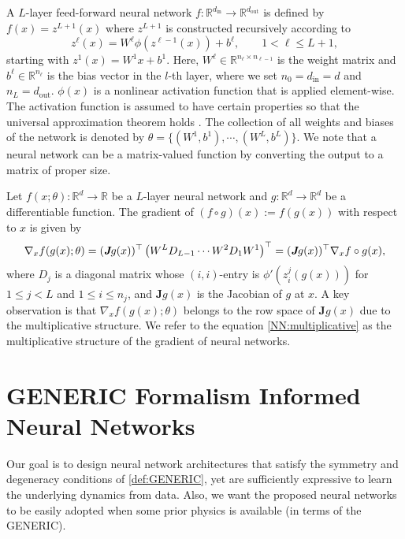 \documentclass[openacc]{rsproca_new}%
\begin{document}
A $L$-layer feed-forward neural network $f:\mathbb{R}^{d_\text{in}} \to \mathbb{R}^{d_\text{out}}$ is 
defined by $f(x) = z^{L+1}(x)$
where $z^{L+1}$ is constructed 
recursively according to
\begin{equation*}
z^{\ell}(x) = W^{\ell}\phi(z^{\ell-1}(x)) + b^{\ell}, \qquad 1 < \ell \le L+1,
\end{equation*}
starting with $z^1(x) = W^1x + b^1$.
Here, $W^\ell \in \mathbb{R}^{n_{\ell} \times n_{\ell-1}}$ is the weight matrix and $b^\ell \in \mathbb{R}^{n_{\ell}}$ is the bias vector in the $l$-th layer,
where we set $n_{0} = d_\text{in} = d$ and $n_{L} = d_\text{out}$.
$\phi(x)$ is a nonlinear activation function that is applied element-wise.
The activation function is assumed to have certain properties
so that the universal approximation theorem holds \cite{Cybenko_MoC89,siegel2020approximation,Mhaskar_Neurl96}. 
The collection of all weights and biases of the network
is denoted by 
$\theta = \{(W^1, b^1), \cdots, (W^L, b^L)\}.$
We note that 
a neural network can be a matrix-valued function by converting the output to
a matrix of proper size. 


Let $f(x;\theta):\mathbb{R}^{d} \to \mathbb{R}$ be a $L$-layer neural network
and $g:\mathbb{R}^d\to \mathbb{R}^d$
be a differentiable function.
The gradient of $(f\circ g)(x):=f(g(x))$ with respect to $x$ is given by
\begin{equation} \label{NN:multiplicative}
        \nabla_{x} f(g(x);\theta) 
        = (\emph{\textbf{J}}g(x))^\top\left(W^LD_{L-1} \cdots W^2D_1W^1\right)^\top
        = (\emph{\textbf{J}}g(x))^\top \nabla_{x} f \circ g(x),
\end{equation}
where $D_j$ is a diagonal matrix whose $(i,i)$-entry is $\phi'(z^j_i(g(x)))$
for $1 \le j < L$ and $1 \le i \le n_j$,
and $\textbf{J}g(x)$ is the Jacobian of $g$ at $x$.
A key observation is that 
$\nabla_{x} f(g(x);\theta)$
belongs to the row space of $\textbf{J}g(x)$
due to the multiplicative structure. 
We refer to the equation \eqref{NN:multiplicative}
as the multiplicative structure of the gradient of neural networks.


\section{GENERIC Formalism Informed Neural Networks} \label{sec:methods}
Our goal is to design neural network architectures 
that satisfy the symmetry and degeneracy conditions of \eqref{def:GENERIC},
yet are sufficiently expressive to learn the underlying dynamics from data.
Also, we want the proposed neural networks to be easily adopted when some prior physics is available (in terms of the GENERIC). 
\end{document}
